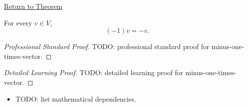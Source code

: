 \newpage
{}
\label{prf:minus-one-times-vector}

\begin{remark*}[Return]
\hyperref[thm:minus-one-times-vector]{Return to Theorem}
\end{remark*}

\begin{theorem*}[$(-1)v=-v$]
For every $v \in V$,
\[
(-1)v=-v.
\]
\end{theorem*}

\begin{proof}[Professional Standard Proof]
\LRAProofBodyStart
TODO: professional standard proof for minus-one-times-vector.
\end{proof}

\begin{proof}[Detailed Learning Proof]
\LRAProofBodyStart
TODO: detailed learning proof for minus-one-times-vector.
\end{proof}

\begin{remark*}
\end{remark*}

\begin{dependencies}
\begin{itemize}
  \item TODO: list mathematical dependencies.
\end{itemize}
\end{dependencies}

\clearpage
